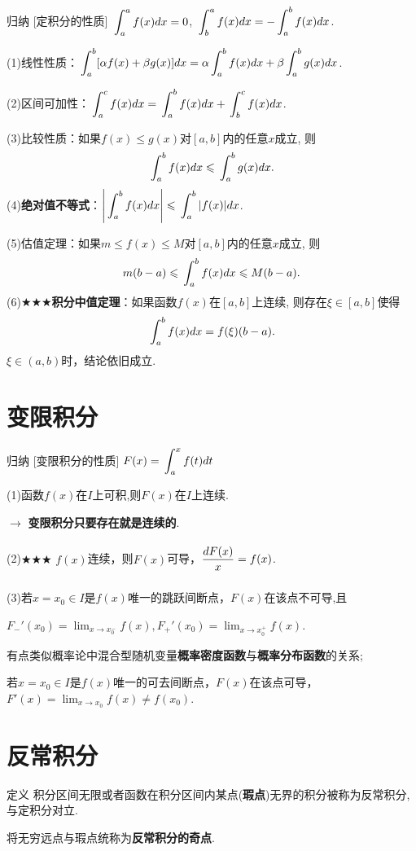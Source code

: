 \documentclass[a4paper,12pt,oneside,fontset=none]{ctexbook}
\renewcommand{\le}{\leqslant}
\let\olddfrac\dfrac
\renewcommand{\dfrac}[2]{
    \olddfrac{#1\vrule width 0pt height 1.15em depth 0em}{#2\vrule width 0pt height 0em depth 0.6em}
}
\let\oldlim\lim
\renewcommand{\lim}{\displaystyle\oldlim}
\let\oldint\int
\renewcommand{\int}{\displaystyle{\vrule width 0pt height 0em depth 0em}\oldint}
\newenvironment{induction}[1][]{\begin{thmBox}{归纳}{#1}}{\end{thmBox}}
\newcounter{definition}[chapter]
\newenvironment{definition}[1][]{\begin{defBox}{定义}{#1}}{\end{defBox}}
\numberwithin{equation}{chapter}
\begin{document}
\begin{induction}
    [定积分的性质]
    $\int_{a}^{a}f(x) dx = 0$, $\int_{b}^{a}f(x) dx = -\int_{a}^{b}f(x) dx$.
    
    (1)线性性质：$\int_a^b [\alpha f(x) + \beta g(x)] dx = \alpha \int_a^b f(x) dx + \beta \int_a^b g(x) dx$.

    (2)区间可加性：$\int_a^c f(x) dx = \int_a^b f(x) dx + \int_b^c f(x) dx$.

    (3)比较性质：如果$f(x) \le g(x)$对$[a,b]$内的任意$x$成立, 则
    \[
        \int_a^b f(x) dx \le \int_a^b g(x) dx.
    \]
    (4)\textbf{绝对值不等式}：$\left|\int_a^b f(x) dx\right| \le \int_a^b |f(x)| dx$.

    (5)估值定理：如果$m \le f(x) \le M$对$[a,b]$内的任意$x$成立, 则
    \[
        m(b-a) \le \int_a^b f(x) dx \le M(b-a).
    \]
    (6)$\bigstar\bigstar\bigstar$\textbf{积分中值定理}：如果函数$f(x)$在$[a,b]$上连续, 则存在$\xi\in[a,b]$使得
    \[
        \int_a^b f(x) dx = f(\xi)(b-a). 
    \]
    $\xi \in (a,b)$时，结论依旧成立.
\end{induction}


\section{变限积分}
\begin{induction}
    [变限积分的性质]
    $F(x) = \int_{a}^{x} f(t) dt$

    (1)函数$f(x)$在$I$上可积,则$F(x)$在$I$上连续.
    
    $\rightarrow$ \textbf{变限积分只要存在就是连续的}.

    (2)$\bigstar \bigstar \bigstar$ $f(x)$连续，则$F(x)$可导，$\dfrac{dF(x)}{x} = f(x)$.

    (3)若$x=x_0 \in I$是$f(x)$唯一的跳跃间断点，$F(x)$在该点不可导,且

    $F_{-}'(x_0) = \lim_{x\to x_0^-}f(x), F_{+}'(x_0) = \lim_{x\to x_0^+}f(x)$.
    
    有点类似概率论中混合型随机变量\textbf{概率密度函数}与\textbf{概率分布函数}的关系;

    若$x=x_0 \in I$是$f(x)$唯一的可去间断点，$F(x)$在该点可导，$F'(x) = \lim_{x\to x_0}f(x) \neq f(x_0)$.


\end{induction}



\section{反常积分}
\begin{definition}
    积分区间无限或者函数在积分区间内某点(\textbf{瑕点})无界的积分被称为反常积分,与定积分对立.

    将无穷远点与瑕点统称为\textbf{反常积分的奇点}.
\end{definition}
\end{document}
